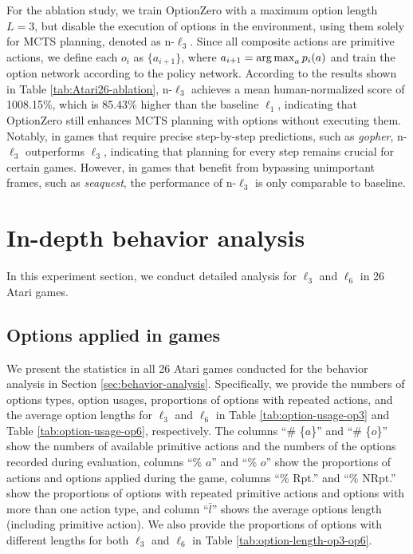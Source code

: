 For the ablation study, we train OptionZero with a maximum option length $L = 3$, but disable the execution of options in the environment, using them solely for MCTS planning, denoted as n-$\ell_3$.
Since all composite actions are primitive actions, we define each $o_i$ as $\{a_{i+1}\}$, where $a_{i+1}=\operatorname*{arg\,max}_a p_i(a)$ and train the option network according to the policy network.
According to the results shown in Table \ref{tab:Atari26-ablation}, n-$\ell_3$ achieves a mean human-normalized score of 1008.15\%, which is 85.43\% higher than the baseline $\ell_1$, indicating that OptionZero still enhances MCTS planning with options without executing them.
Notably, in games that require precise step-by-step predictions, such as \textit{gopher}, n-$\ell_3$ outperforms $\ell_3$, indicating that planning for every step remains crucial for certain games.
However, in games that benefit from bypassing unimportant frames, such as \textit{seaquest}, the performance of n-$\ell_3$ is only comparable to baseline.



\clearpage

\section{In-depth behavior analysis}\label{appendix:behavior-analysis}

In this experiment section, we conduct detailed analysis for $\ell_3$ and $\ell_6$ in 26 Atari games.

\subsection{Options applied in games}
\label{appendix:options-applied}

We present the statistics in all 26 Atari games conducted for the behavior analysis in Section \ref{sec:behavior-analysis}.
Specifically, we provide the numbers of options types, option usages, proportions of options with repeated actions, and the average option lengths for $\ell_3$ and $\ell_6$ in Table \ref{tab:option-usage-op3} and Table \ref{tab:option-usage-op6}, respectively.
The columns ``\# \{$a$\}'' and ``\# \{$o$\}'' show the numbers of available primitive actions and the numbers of the options recorded during evaluation, columns ``\% $a$'' and ``\% $o$'' show the proportions of actions and options applied during the game, columns ``\% Rpt.'' and ``\% NRpt.'' show the proportions of options with repeated primitive actions and options with more than one action type, and column ``$\bar{l}$'' shows the average options length (including primitive action).
We also provide the proportions of options with different lengths for both  $\ell_3$ and $\ell_6$ in Table \ref{tab:option-length-op3-op6}.

